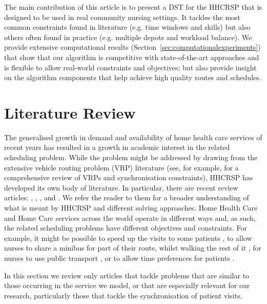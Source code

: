 \documentclass[a4paper,11pt,authoryear]{elsarticle}
\begin{document}
The main contribution of this article is to present a DST for the HHCRSP that is designed to be used in real community nursing settings. It tackles the most common constraints found in literature (e.g. time windows and skills) but also others often found in practice (e.g. multiple depots and workload balance). We provide extensive computational results (Section~\ref{sec:computationalexperiments}) that show that our algorithm is competitive with state-of-the-art approaches and is flexible to allow real-world constraints and objectives; but also provide insight on the algorithm components that help achieve high quality routes and schedules. 

\section{Literature Review}
\label{sec:litreview}
\noindent The generalised growth in demand and availability of home health care services of recent years has resulted in a growth in academic interest in the related scheduling problem. While the problem might be addressed by drawing from the extensive vehicle routing problem (VRP) literature (see, for example, \cite{drexl2012} for a comprehensive review of VRPs and synchronisation constraints), HHCRSP has developed its own body of literature. In particular, there are recent review articles: \cite{cisse2017}, \cite{fikar2017}, \citet{dimascolo2021}, and \citet{grieco2020}. We refer the reader to them for a broader understanding of what is meant by HHCRSP and different solving approaches. Home Health Care and Home Care services across the world operate in different ways and, as such, the related scheduling problems have different objectives and constraints. For example, it might be possible to speed up the visits to some patients \citep{mosquera2019}, to allow nurses to share a minibus for part of their route, whilst walking the rest of it \citep{fikar2015}, for nurses to use public transport \citep{rest2016}, or to allow time preferences for patients \citep{decerle2018}. %


In this section we review only articles that tackle problems that are similar to those occurring in the service we model, or that are especially relevant for our research, particularly those that tackle the synchronisation of patient visits.  
\end{document}
